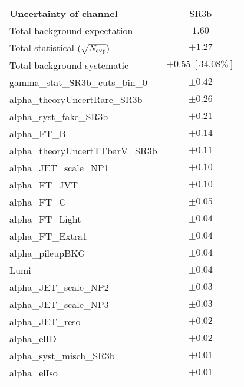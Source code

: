 
\begin{table}
\begin{center}
\setlength{\tabcolsep}{0.0pc}
\begin{tabular*}{\textwidth}{@{\extracolsep{\fill}}lc}
\noalign{\smallskip}\hline\noalign{\smallskip}
{\bf Uncertainty of channel}                                    & SR3b            \\
\noalign{\smallskip}\hline\noalign{\smallskip}
Total background expectation             &  $1.60$       \\
\noalign{\smallskip}\hline\noalign{\smallskip}
Total statistical $(\sqrt{N_{\rm exp}})$              & $\pm 1.27$       \\
Total background systematic               & $\pm 0.55\ [34.08\%] $             \\
\noalign{\smallskip}\hline\noalign{\smallskip}
\noalign{\smallskip}\hline\noalign{\smallskip}
gamma\_stat\_SR3b\_cuts\_bin\_0         & $\pm 0.42$       \\
alpha\_theoryUncertRare\_SR3b         & $\pm 0.26$       \\
alpha\_syst\_fake\_SR3b         & $\pm 0.21$       \\
alpha\_FT\_B         & $\pm 0.14$       \\
alpha\_theoryUncertTTbarV\_SR3b         & $\pm 0.11$       \\
alpha\_JET\_scale\_NP1         & $\pm 0.10$       \\
alpha\_FT\_JVT         & $\pm 0.10$       \\
alpha\_FT\_C         & $\pm 0.05$       \\
alpha\_FT\_Light         & $\pm 0.04$       \\
alpha\_FT\_Extra1         & $\pm 0.04$       \\
alpha\_pileupBKG         & $\pm 0.04$       \\
Lumi         & $\pm 0.04$       \\
alpha\_JET\_scale\_NP2         & $\pm 0.03$       \\
alpha\_JET\_scale\_NP3         & $\pm 0.03$       \\
alpha\_JET\_reso         & $\pm 0.02$       \\
alpha\_elID         & $\pm 0.02$       \\
alpha\_syst\_misch\_SR3b         & $\pm 0.01$       \\
alpha\_elIso         & $\pm 0.01$       \\

\end{tabular*}
\end{center}
\end{table}
